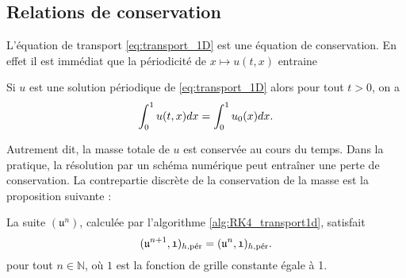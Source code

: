 \subsection{Relations de conservation}

L'équation de transport \eqref{eq:transport_1D} est une équation de conservation. En effet il est immédiat que la périodicité de $x \mapsto u(t,x)$ entraine

\begin{proposition}
Si $u$ est une solution périodique de \eqref{eq:transport_1D} alors pour tout $t>0$, on a
\begin{equation}
\gint_0^1 u(t,x)dx = \gint_0^1 u_0(x)dx.
\end{equation}
\end{proposition}

Autrement dit, la masse totale de $u$ est conservée au cours du temps. Dans la pratique, la résolution par un schéma numérique peut entraîner une perte de conservation. 
La contrepartie discrète de la conservation de la masse est la proposition suivante :

\begin{proposition}
La suite $(\mathfrak{u}^n)$, calculée par l'algorithme \ref{alg:RK4_transport1d}, satisfait
\begin{equation}
(\mathfrak{u}^{n+1}, \mathfrak{1})_{h,\per} = (\mathfrak{u}^n, \mathfrak{1})_{h,\per}.
\end{equation}
pour tout $n \in \mathbb{N}$, où $\mathfrak{1}$ est la fonction de grille constante égale à 1.
\end{proposition}

